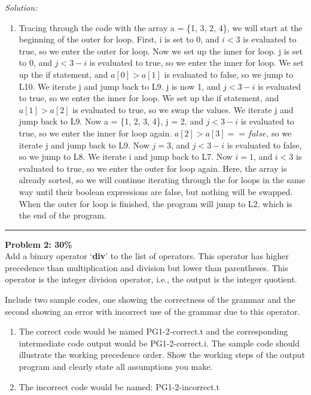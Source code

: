 \documentclass[a4paper, 11pt]{article}
\newenvironment{problem}[2][Problem]
    { \begin{mdframed}[backgroundcolor=gray!20] \textbf{#1 #2} \\}
    {  \end{mdframed}}
\newenvironment{solution}
    {\textit{Solution:}}
    {}
\begin{document}
\begin{solution}
\begin{enumerate}[a]
        \item Tracing through the code with the array a = \{1, 3, 2, 4\}, we will start at the beginning of the outer for loop. First, i is set to 0, and $i < 3$ is evaluated to true, so we enter the outer for loop.
              Now we set up the inner for loop. j is set to 0, and $j < 3 - i$ is evaluated to true, so we enter the inner for loop. We set up the if statement, and $a[0] > a[1]$ is evaluated to false, so we jump to L10.
              We iterate j and jump back to L9. j is now 1, and $j < 3 - i$ is evaluated to true, so we enter the inner for loop. We set up the if statement, and $a[1] > a[2]$ is evaluated to true, so we swap the values. We iterate j and jump back to L9.
              Now a = \{1, 2, 3, 4\}, j = 2, and $j < 3 - i$ is evaluated to true, so we enter the inner for loop again. $a[2] > a[3] == false$, so we iterate j and jump back to L9. Now $j = 3$, and $j < 3 - i$ is evaluated to false, so we jump to L8. We iterate i and jump back to L7.
              Now $i = 1$, and $i < 3$ is evaluated to true, so we enter the outer for loop again. Here, the array is already sorted, so we will continue iterating through the for loops in the same way until their boolean expressions are false, but nothing will be swapped. When
              the outer for loop is finished, the program will jump to L2, which is the end of the program.

    \end{enumerate}
\end{solution}
\noindent\rule{7in}{2.8pt}



\begin{problem}{2: 30\%}
Add a binary operator `\textbf{div}' to the list of operators. This operator has higher precedence than multiplication and division but lower than parentheses. This operator is the integer division operator, i.e., the output is the integer quotient.

\vspace{\baselineskip}

\noindent Include two sample codes, one showing the correctness of the grammar and the second showing an error with incorrect use of the grammar due to this operator.

\begin{enumerate}
    \item The correct code would be named PG1-2-correct.t and the corresponding intermediate code output would be PG1-2-correct.i. The sample code should illustrate the working precedence order. Show the working steps of the output program and clearly state all assumptions you make.
    \item The incorrect code would be named: PG1-2-incorrect.t
\end{enumerate}

\end{problem}
\end{document}
